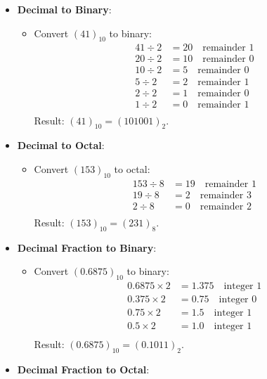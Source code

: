 \documentclass[a4paper,12pt]{article}
\begin{document}
	\begin{itemize}
		\item \textbf{Decimal to Binary}:
		\begin{itemize}
			\item Convert $(41)_{10}$ to binary:
			\begin{align*}
				41 \div 2 &= 20 \quad \text{remainder } 1 \\
				20 \div 2 &= 10 \quad \text{remainder } 0 \\
				10 \div 2 &= 5 \quad \text{remainder } 0 \\
				5 \div 2 &= 2 \quad \text{remainder } 1 \\
				2 \div 2 &= 1 \quad \text{remainder } 0 \\
				1 \div 2 &= 0 \quad \text{remainder } 1 \\
			\end{align*}
			Result: $(41)_{10} = (101001)_2$.
		\end{itemize}
		\item \textbf{Decimal to Octal}:
		\begin{itemize}
			\item Convert $(153)_{10}$ to octal:
			\begin{align*}
				153 \div 8 &= 19 \quad \text{remainder } 1 \\
				19 \div 8 &= 2 \quad \text{remainder } 3 \\
				2 \div 8 &= 0 \quad \text{remainder } 2 \\
			\end{align*}
			Result: $(153)_{10} = (231)_8$.
		\end{itemize}
		\item \textbf{Decimal Fraction to Binary}:
		\begin{itemize}
			\item Convert $(0.6875)_{10}$ to binary:
			\begin{align*}
				0.6875 \times 2 &= 1.375 \quad \text{integer } 1 \\
				0.375 \times 2 &= 0.75 \quad \text{integer } 0 \\
				0.75 \times 2 &= 1.5 \quad \text{integer } 1 \\
				0.5 \times 2 &= 1.0 \quad \text{integer } 1 \\
			\end{align*}
			Result: $(0.6875)_{10} = (0.1011)_2$.
		\end{itemize}
		\item \textbf{Decimal Fraction to Octal}:
		\begin{itemize}

\end{itemize}
\end{itemize}
\end{document}
